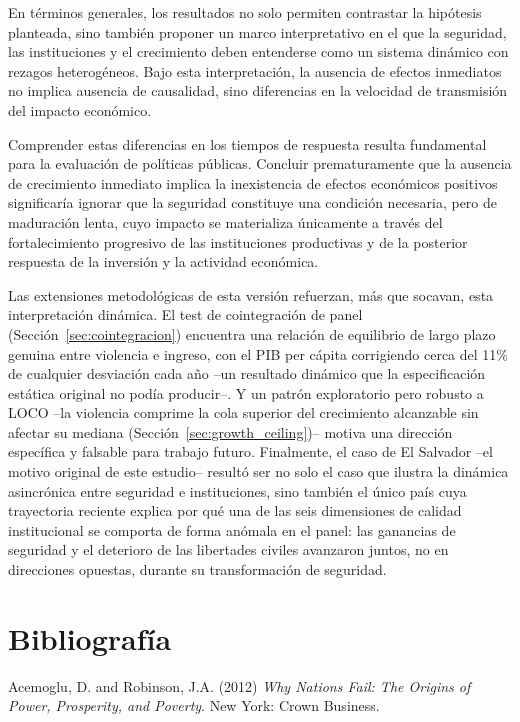 \documentclass[11pt,a4paper]{article}
\begin{document}
En términos generales, los resultados no solo permiten contrastar la hipótesis planteada, sino también proponer un marco interpretativo en el que la seguridad, las instituciones y el crecimiento deben entenderse como un sistema dinámico con rezagos heterogéneos. Bajo esta interpretación, la ausencia de efectos inmediatos no implica ausencia de causalidad, sino diferencias en la velocidad de transmisión del impacto económico.

Comprender estas diferencias en los tiempos de respuesta resulta fundamental para la evaluación de políticas públicas. Concluir prematuramente que la ausencia de crecimiento inmediato implica la inexistencia de efectos económicos positivos significaría ignorar que la seguridad constituye una condición necesaria, pero de maduración lenta, cuyo impacto se materializa únicamente a través del fortalecimiento progresivo de las instituciones productivas y de la posterior respuesta de la inversión y la actividad económica.

Las extensiones metodológicas de esta versión refuerzan, más que socavan, esta interpretación dinámica. El test de cointegración de panel (Sección~\ref{sec:cointegracion}) encuentra una relación de equilibrio de largo plazo genuina entre violencia e ingreso, con el PIB per cápita corrigiendo cerca del 11\% de cualquier desviación cada año --un resultado dinámico que la especificación estática original no podía producir--. Y un patrón exploratorio pero robusto a LOCO --la violencia comprime la cola superior del crecimiento alcanzable sin afectar su mediana (Sección~\ref{sec:growth_ceiling})-- motiva una dirección específica y falsable para trabajo futuro. Finalmente, el caso de El Salvador --el motivo original de este estudio-- resultó ser no solo el caso que ilustra la dinámica asincrónica entre seguridad e instituciones, sino también el único país cuya trayectoria reciente explica por qué una de las seis dimensiones de calidad institucional se comporta de forma anómala en el panel: las ganancias de seguridad y el deterioro de las libertades civiles avanzaron juntos, no en direcciones opuestas, durante su transformación de seguridad.
\section*{Bibliografía}

Acemoglu, D. and Robinson, J.A. (2012) \textit{Why Nations Fail: The Origins of Power, Prosperity, and Poverty}. New York: Crown Business.
\end{document}
